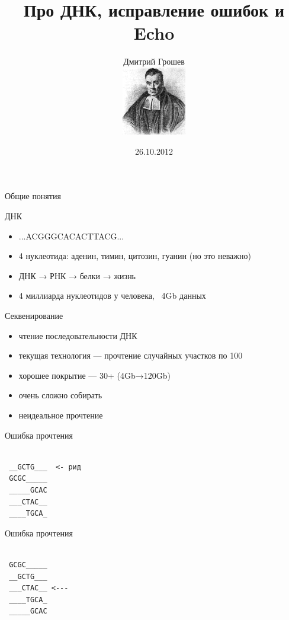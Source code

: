 \documentclass[10pt]{beamer}
\title[Bayecho]{Про ДНК, исправление ошибок и Echo}
\author{Дмитрий Грошев\\
  \includegraphics[height=3cm]{thomas_bayes.png}}
\date{26.10.2012}
\institute{СПбГУ}
\begin{document}
\renewcommand*{\inserttotalframenumber}{\pageref{lastframe}}
\begin{frame}
\titlepage
\end{frame}


\begin{frame}
  \begin{center}
    \Large
    Общие понятия
  \end{center}
\end{frame}

\begin{frame}{ДНК}
  \begin{itemize}
  \item ...ACGGGCACACTTACG...
  \item 4 нуклеотида: аденин, тимин, цитозин, гуанин (но это неважно)
  \item ДНК → РНК → белки → жизнь
  \item 4 миллиарда нуклеотидов у человека, ~4Gb данных
  \end{itemize}
\end{frame}

\begin{frame}{Секвенирование}
  \begin{itemize}
  \item чтение последовательности ДНК
  \item текущая технология — прочтение случайных участков по 100
  \item хорошее покрытие — 30+ (4Gb→120Gb)
  \item очень сложно собирать
  \item неидеальное прочтение
  \end{itemize}
\end{frame}

\begin{frame}[fragile]{Ошибка прочтения}
\begin{verbatim}

 __GCTG___  <- рид
 GCGC_____
 _____GCAC
 ___CTAC__
 ____TGCA_
\end{verbatim}
\end{frame}

\begin{frame}[fragile]{Ошибка прочтения}
\begin{verbatim}

 GCGC_____
 __GCTG___
 ___CTAC__ <---
 ____TGCA_
 _____GCAC
\end{verbatim}
\end{frame}
\end{document}
